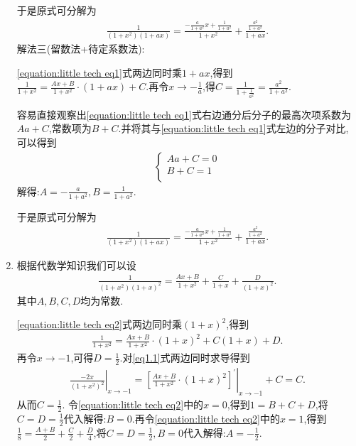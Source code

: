 \documentclass[../../main.tex]{subfiles}
\begin{document}
\begin{solution}
\begin{enumerate}
于是原式可分解为
\begin{align*}
\frac{1}{\left( 1+x^2 \right) \left( 1+ax \right)}=\frac{-\frac{a}{1+a^2}x+\frac{1}{1+a^2}}{1+x^2}+\frac{\frac{a^2}{1+a^2}}{1+ax}.
\end{align*}
{\color{blue}解法三(留数法+待定系数法):}

\eqref{equation:little tech eq1}式两边同时乘$1+ax$,得到$\frac{1}{1+x^2}=\frac{Ax+B}{1+x^2}\cdot \left( 1+ax \right) +C$.再令$x\to-\frac{1}{a}$,得$C=\frac{1}{1+\frac{1}{a^2}}=\frac{a^2}{1+a^2}$.

容易直接观察出\eqref{equation:little tech eq1}式右边通分后分子的最高次项系数为$Aa+C$,常数项为$B+C$.并将其与\eqref{equation:little tech eq1}式左边的分子对比,可以得到
\begin{align*}
\begin{cases}
Aa+C=0\\
B+C=1\\
\end{cases}
\end{align*}
解得:$A=-\frac{a}{1+a^2},B=\frac{1}{1+a^2}$.

于是原式可分解为
\begin{align*}
\frac{1}{\left( 1+x^2 \right) \left( 1+ax \right)}=\frac{-\frac{a}{1+a^2}x+\frac{1}{1+a^2}}{1+x^2}+\frac{\frac{a^2}{1+a^2}}{1+ax}.
\end{align*}

\item 根据代数学知识我们可以设
\begin{align}\label{equation:little tech eq2}
\frac{1}{\left( 1+x^2 \right) \left( 1+x \right) ^2}=\frac{Ax+B}{1+x^2}+\frac{C}{1+x}+\frac{D}{\left( 1+x \right) ^2}.  
\end{align}
其中$A,B,C,D$均为常数.

\eqref{equation:little tech eq2}式两边同时乘$(1+x)^2$,得到
\begin{align}\label{eq1.1}
\frac{1}{1+x^2}=\frac{Ax+B}{1+x^2}\cdot \left( 1+x \right) ^2+C\left( 1+x \right)+D.
\end{align}
再令$x\to-1$,可得$D=\frac{1}{2}$.对\eqref{eq1.1}式两边同时求导得到
\begin{align*}
\left.\frac{-2x}{\left( 1+x^2 \right) ^2}\right|_{x\rightarrow -1}^{}=\left.\left[ \frac{Ax+B}{1+x^2}\cdot \left( 1+x \right) ^2 \right] ^{\prime}\right|_{x\rightarrow -1}+C=C.
\end{align*}
从而$C=\frac{1}{2}$.
令\eqref{equation:little tech eq2}中的$x=0$,得到$1=B+C+D$,将$C=D=\frac{1}{2}$代入解得:$B=0$.再令\eqref{equation:little tech eq2}中的$x=1$,得到$\frac{1}{8}=\frac{A+B}{2}+\frac{C}{2}+\frac{D}{4}$,将$C=D=\frac{1}{2},B=0$代入解得:$A=-\frac{1}{2}$.


\end{enumerate}
\end{solution}
\end{document}
